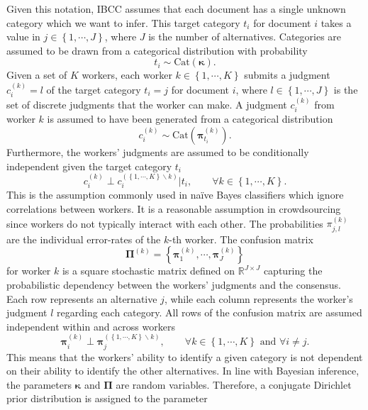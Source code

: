 \documentclass{article}
\begin{document}
 Given this notation, IBCC assumes that each document has a single
unknown category which we want to infer.
This target category $t_{i}$ for document $i$ takes a value in $j\in\left\{ 1,\cdots,J\right\} $,
where $J$ is the number of alternatives. Categories are assumed to
be drawn from a categorical distribution with probability
\begin{equation}
t_{i}\sim\mbox{Cat}\left(\boldsymbol{\kappa}\right).\label{eq:ibcc-t|kappa}
\end{equation}
Given a set of $K$ workers, each worker $k\in\left\{ 1,\cdots,K\right\} $
submits a judgment $c_{i}^{(k)}=l$ of the target category $t_{i}=j$
for document $i$, where $l\in\left\{ 1,\cdots,J\right\} $ is the
set of discrete judgments that the worker can make. A judgment $c_{i}^{(k)}$
from worker $k$ is assumed to have been generated from a categorical
distribution
\begin{equation}
c_{i}^{(k)}\sim\mbox{Cat}\left(\boldsymbol{\pi}_{t_{i}}^{(k)}\right).\label{eq:ibcc-c|pi}
\end{equation}
Furthermore, the workers' judgments are assumed to be conditionally
independent given the target category $t_{i}$
\[
c_{i}^{(k)}\perp c_{i}^{\left(\left\{ 1,\cdots,K\right\} \backslash k\right)}|t_{i},\qquad\forall k\in\left\{ 1,\cdots,K\right\} .
\]
This is the assumption commonly used in naïve Bayes classifiers which
ignore correlations between workers. It is a reasonable assumption
in crowdsourcing since workers do not typically interact with each
other. The probabilities $\pi_{j,l}^{(k)}$ are the individual error-rates
of the $k$-th worker. The confusion matrix 
\[
\boldsymbol{\Pi}^{(k)}=\left\{ \boldsymbol{\pi}_{1}^{(k)},\cdots,\boldsymbol{\pi}_{J}^{(k)}\right\} 
\]
for worker $k$ is a square stochastic matrix defined on $\mathbb{R}^{J\times J}$
capturing the probabilistic dependency between the workers' judgments
and the consensus. Each row represents an alternative $j$,
while each column represents the worker's judgment $l$
regarding each category. All rows of the confusion matrix are assumed
independent within and across workers
\[
\boldsymbol{\pi}_{i}^{(k)}\perp\boldsymbol{\pi}_{j}^{\left(\left\{ 1,\cdots,K\right\} \backslash k\right)},\qquad\forall k\in\left\{ 1,\cdots,K\right\} \mbox{ and }\forall i\neq j.
\]
This means that the workers' ability to identify a given category
is not dependent on their ability to identify the other alternatives.
In line with Bayesian inference, the parameters $\boldsymbol{\kappa}$
and $\boldsymbol{\Pi}$ are random variables. Therefore,
a conjugate Dirichlet prior distribution is assigned to the parameter
\end{document}
